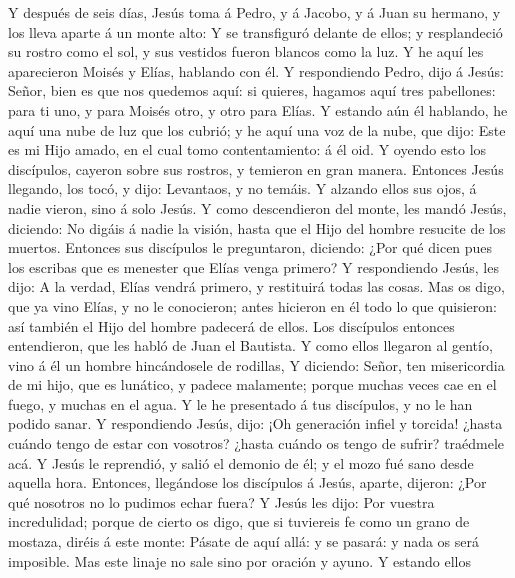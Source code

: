  Y después de seis días, Jesús toma á Pedro, y á Jacobo, y á
Juan su hermano, y los lleva aparte á un monte alto:  Y se
transfiguró delante de ellos; y resplandeció su rostro como el sol, y
sus vestidos fueron blancos como la luz.  Y he aquí les
aparecieron Moisés y Elías, hablando con él.  Y respondiendo
Pedro, dijo á Jesús: Señor, bien es que nos quedemos aquí: si quieres,
hagamos aquí tres pabellones: para ti uno, y para Moisés otro, y otro
para Elías.  Y estando aún él hablando, he aquí una nube de
luz que los cubrió; y he aquí una voz de la nube, que dijo: Este es mi
Hijo amado, en el cual tomo contentamiento: á él oid.  Y
oyendo esto los discípulos, cayeron sobre sus rostros, y temieron en
gran manera.  Entonces Jesús llegando, los tocó, y dijo:
Levantaos, y no temáis.  Y alzando ellos sus ojos, á nadie
vieron, sino á solo Jesús.  Y como descendieron del monte,
les mandó Jesús, diciendo: No digáis á nadie la visión, hasta que el
Hijo del hombre resucite de los muertos.  Entonces sus
discípulos le preguntaron, diciendo: ¿Por qué dicen pues los escribas
que es menester que Elías venga primero?  Y respondiendo
Jesús, les dijo: A la verdad, Elías vendrá primero, y restituirá todas
las cosas.  Mas os digo, que ya vino Elías, y no le
conocieron; antes hicieron en él todo lo que quisieron: así también el
Hijo del hombre padecerá de ellos.  Los discípulos entonces
entendieron, que les habló de Juan el Bautista.  Y como
ellos llegaron al gentío, vino á él un hombre hincándosele de rodillas,
 Y diciendo: Señor, ten misericordia de mi hijo, que es
lunático, y padece malamente; porque muchas veces cae en el fuego, y
muchas en el agua.  Y le he presentado á tus discípulos, y
no le han podido sanar.  Y respondiendo Jesús, dijo: ¡Oh
generación infiel y torcida! ¿hasta cuándo tengo de estar con vosotros?
¿hasta cuándo os tengo de sufrir? traédmele acá.  Y Jesús
le reprendió, y salió el demonio de él; y el mozo fué sano desde aquella
hora.  Entonces, llegándose los discípulos á Jesús, aparte,
dijeron: ¿Por qué nosotros no lo pudimos echar fuera?  Y
Jesús les dijo: Por vuestra incredulidad; porque de cierto os digo, que
si tuviereis fe como un grano de mostaza, diréis á este monte: Pásate de
aquí allá: y se pasará: y nada os será imposible.  Mas este
linaje no sale sino por oración y ayuno.  Y estando ellos
